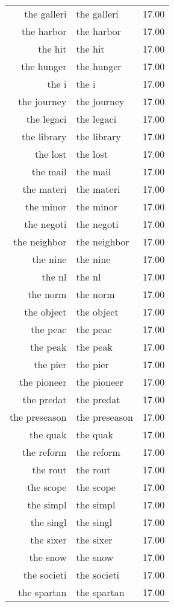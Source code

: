 \begin{table}[ht]
\begin{tabular}{rlr}
  the galleri & the galleri & 17.00 \\ 
  the harbor & the harbor & 17.00 \\ 
  the hit & the hit & 17.00 \\ 
  the hunger & the hunger & 17.00 \\ 
  the i & the i & 17.00 \\ 
  the journey & the journey & 17.00 \\ 
  the legaci & the legaci & 17.00 \\ 
  the library & the library & 17.00 \\ 
  the lost & the lost & 17.00 \\ 
  the mail & the mail & 17.00 \\ 
  the materi & the materi & 17.00 \\ 
  the minor & the minor & 17.00 \\ 
  the negoti & the negoti & 17.00 \\ 
  the neighbor & the neighbor & 17.00 \\ 
  the nine & the nine & 17.00 \\ 
  the nl & the nl & 17.00 \\ 
  the norm & the norm & 17.00 \\ 
  the object & the object & 17.00 \\ 
  the peac & the peac & 17.00 \\ 
  the peak & the peak & 17.00 \\ 
  the pier & the pier & 17.00 \\ 
  the pioneer & the pioneer & 17.00 \\ 
  the predat & the predat & 17.00 \\ 
  the preseason & the preseason & 17.00 \\ 
  the quak & the quak & 17.00 \\ 
  the reform & the reform & 17.00 \\ 
  the rout & the rout & 17.00 \\ 
  the scope & the scope & 17.00 \\ 
  the simpl & the simpl & 17.00 \\ 
  the singl & the singl & 17.00 \\ 
  the sixer & the sixer & 17.00 \\ 
  the snow & the snow & 17.00 \\ 
  the societi & the societi & 17.00 \\ 
  the spartan & the spartan & 17.00 \\ 

\end{tabular}
\end{table}
